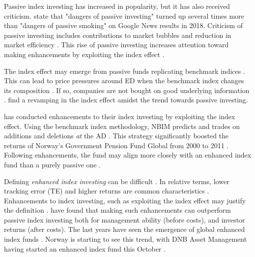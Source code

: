  Passive index investing has increased in popularity, but it has also received criticism. \textcite{spglobal-the-slings-and-arrows-of-passive-fortune} state that "dangers of passive investing" turned up several times more than "dangers of passive smoking" on Google News results in 2018. Criticism of passive investing includes contributions to market bubbles and reduction in market efficiency \parencite{spglobal-the-slings-and-arrows-of-passive-fortune}. This rise of passive investing increases attention toward making enhancements by exploiting the index effect \parencite{elton-gruber-are-enhanced-index-funds-enhanced}.

The index effect may emerge from passive funds replicating benchmark indices \parencite{afego-effects-of-changes-in-stock-index-composition}. This can lead to price pressures around ED when the benchmark index changes its composition \parencite{investopedia-s&p-phenomenon}. If so, companies are not bought on good underlying information \parencite{federal-reserve-bank-is-there-an-s&p-500-index-effect}. \textcite{spglobal-what-happened-to-the-index-effect} find a revamping in the index effect amidst the trend towards passive investing. 

\textcite{nbim-investing-in-equities} has conducted enhancements to their index investing by exploiting the index effect. Using the benchmark index methodology, NBIM predicts and trades on additions and deletions \textit{at} the AD \parencite{nbim-investing-in-equities}. This strategy significantly boosted the returns of Norway's Government Pension Fund Global from 2000 to 2011 \parencite{ang-review-of-the-active-management-of-oljefondet}. Following enhancements, the fund may align more closely with an enhanced index fund than a purely passive one \parencite{døskeland-a-review-of-the-active-management-of-oljefondet}. 

Defining \textit{enhanced index investing} can be difficult \parencite{riepe-werner-are-enhanced-index-mutual-funds-worthy-of-their-name}. In relative terms, lower tracking error (TE) and higher returns are common characteristics \parencite{riepe-werner-are-enhanced-index-mutual-funds-worthy-of-their-name}. Enhancements to index investing, such as exploiting the index effect may justify the definition \parencite{goel-index-tracking-and-enhanced-indexing-using-mixed-conditional-value-at-risk}. \textcite{elton-gruber-are-enhanced-index-funds-enhanced} have found that making such enhancements can outperform passive index investing both for management ability (before costs), and investor returns (after costs). The last years have seen the emergence of global enhanced index funds \parencite{jp-morgan-enhanced-index}. Norway is starting to see this trend, with DNB Asset Management having started an enhanced index fund this October \parencite{dnb-global-enhanced-index}.

